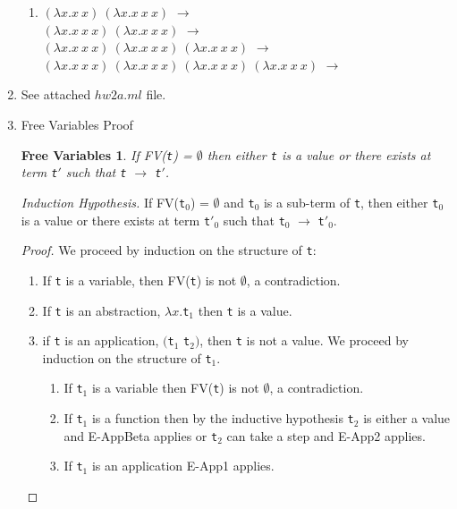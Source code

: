 \documentclass{article}
\newtheorem{free}{Free Variables}
\begin{document}
\begin{enumerate}
\begin{enumerate}
    \item $(\lambda x.x\ x)\ (\lambda x.x\ x\ x)$ $\longrightarrow$ \\
      $(\lambda x.x\ x\ x)\ (\lambda x.x\ x\ x)$ $\longrightarrow$ \\
      $(\lambda x.x\ x\ x)\ (\lambda x.x\ x\ x)\ (\lambda x.x\ x\ x)$
      $\longrightarrow$ \\
      $(\lambda x.x\ x\ x)\ (\lambda x.x\ x\ x)\ (\lambda x.x\ x\ x)\ (\lambda x.x\ x\ x)$ $\longrightarrow$ \bot


    \end{enumerate}

  \item{See attached $hw2a.ml$ file.}

  \item{Free Variables Proof}
    \begin{free}
      If FV(\verb|t|) = $\emptyset$ then either \verb|t| is a value or there exists at term \verb|t|$'$ such that \verb|t| $\longrightarrow$ \verb|t|$'$.
    \end{free}

    \textit{Induction Hypothesis.} If FV(\verb|t|$_0$) = $\emptyset$ and \verb|t|$_0$ is a sub-term of \verb|t|, then either \verb|t|$_0$ is a value or there exists at term \verb|t|$'_0$ such that \verb|t|$_0$ $\longrightarrow$ \verb|t|$'_0$.


    \begin{proof}
      We proceed by induction on the structure of \verb|t|:
      \begin{enumerate}
      \item If \verb|t| is a variable, then FV(\verb|t|) is not $\emptyset$, a contradiction.
      \item If \verb|t| is an abstraction, $\lambda x.$\verb|t|$_1$ then \verb|t| is a value.
      \item if \verb|t| is an application, $($\verb|t|$_1$ \verb|t|$_2)$, then \verb|t| is not a value. We proceed by induction on the structure of \verb|t|$_1$.
        \begin{enumerate}
        \item If \verb|t|$_1$ is a variable then FV(\verb|t|) is not $\emptyset$, a contradiction.
        \item If \verb|t|$_1$ is a function then by the inductive hypothesis \verb|t|$_2$ is either a value and E-AppBeta applies or \verb|t|$_2$ can take a step and E-App2 applies.
        \item If \verb|t|$_1$ is an application E-App1 applies.
        \end{enumerate}
      \end{enumerate}
    \end{proof}


\end{enumerate}
\end{document}
